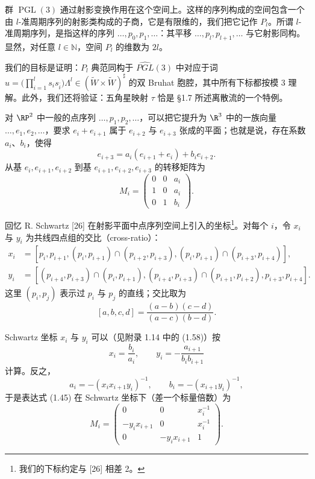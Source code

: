 群 $\operatorname{PGL}(3)$ 通过射影变换作用在这个空间上。这样的序列构成的空间包含一个由 $l$-准周期序列的射影类构成的子商，它是有限维的，我们把它记作 $P_l$。所谓 $l$-准周期序列，是指这样的序列 $\dots,p_0,p_1,\dots$：其平移 $\dots,p_l,p_{l+1},\dots$ 与它射影同构。显然，对任意 $l\in\mathbb N$，空间 $P_l$ 的维数为 $2l$。

我们的目标是证明：$P_l$ 典范同构于 $\widehat{PGL}(3)$ 中对应于词 $u=\bigl(\prod_{i=1}^{l}s_is_{\bar i}\bigr)\Lambda^l\in(\tilde W\times\tilde W)^{\sharp}$ 的双 Bruhat 胞腔，其中所有下标都按模 3 理解。此外，我们还将验证：五角星映射 $\tau$ 恰是 §1.7 所述离散流的一个特例。

对 $\RP^2$ 中一般的点序列 $\dots,p_1,p_2,\dots$，可以把它提升为 $\R^3$ 中的一族向量 $\dots,e_1,e_2,\dots$，要求 $e_i+e_{i+1}$ 属于 $e_{i+2}$ 与 $e_{i+3}$ 张成的平面；也就是说，存在系数 $a_i$、$b_i$，使得
\begin{equation}
e_{i+3}=a_i(e_{i+1}+e_i)+b_ie_{i+2}.
\tag{1.44}\label{eq:1.44}
\end{equation}
从基 $e_i,e_{i+1},e_{i+2}$ 到基 $e_{i+1},e_{i+2},e_{i+3}$ 的转移矩阵为
\begin{equation}
M_i=\begin{pmatrix}
0&0&a_i\\
1&0&a_i\\
0&1&b_i
\end{pmatrix}.
\tag{1.45}\label{eq:1.45}
\end{equation}

回忆 R. Schwartz [26] 在射影平面中点序列空间上引入的坐标\footnote{我们的下标约定与 [26] 相差 2。}。对每个 $i$，令 $x_i$ 与 $y_i$ 为共线四点组的交比（cross-ratio）：
\[
\begin{aligned}
x_i&=[p_i,p_{i+1},(p_i,p_{i+1})\cap(p_{i+2},p_{i+3}),(p_i,p_{i+1})\cap(p_{i+3},p_{i+4})],\\
y_i&=[(p_{i+4},p_{i+3})\cap(p_i,p_{i+1}),(p_{i+4},p_{i+3})\cap(p_{i+1},p_{i+2}),p_{i+3},p_{i+4}].
\end{aligned}
\]
这里 $(p_i,p_j)$ 表示过 $p_i$ 与 $p_j$ 的直线；交比取为
\[
[a,b,c,d]=\frac{(a-b)(c-d)}{(a-c)(b-d)}.
\]

Schwartz 坐标 $x_i$ 与 $y_i$ 可以（见附录 1.14 中的 (1.58)）按
\begin{equation}
x_i=\frac{b_i}{a_i},\qquad y_i=-\frac{a_{i+1}}{b_ib_{i+1}}
\tag{1.46}\label{eq:1.46}
\end{equation}
计算。反之，
\begin{equation}
a_i=-(x_ix_{i+1}y_i)^{-1},\qquad b_i=-(x_{i+1}y_i)^{-1},
\tag{1.47}\label{eq:1.47}
\end{equation}
于是表达式 (1.45) 在 Schwartz 坐标下（差一个标量倍数）为
\begin{equation}
M_i=\begin{pmatrix}
0&0&x_i^{-1}\\
-y_ix_{i+1}&0&x_i^{-1}\\
0&-y_ix_{i+1}&1
\end{pmatrix}.
\tag{1.48}\label{eq:1.48}
\end{equation}

